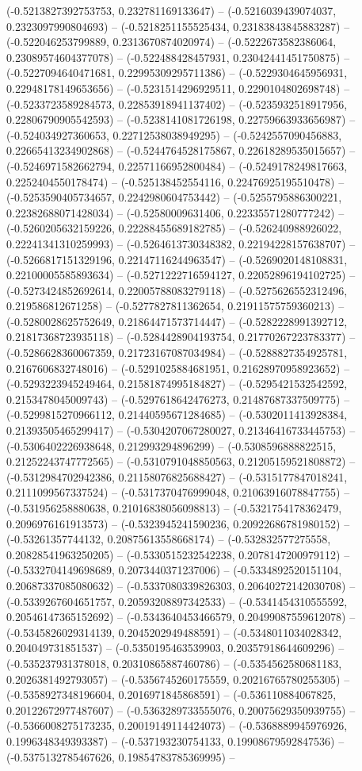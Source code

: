 (-0.5213827392753753, 0.232781169133647) -- (-0.5216039439074037, 0.2323097990804693) -- (-0.5218251155525434, 0.23183843845883287) -- (-0.522046253799889, 0.2313670874020974) -- (-0.5222673582386064, 0.23089574604377078) -- (-0.522488428457931, 0.23042441451750875) -- (-0.5227094640471681, 0.22995309295711386) -- (-0.5229304645956931, 0.22948178149653656) -- (-0.5231514296929511, 0.2290104802698748) -- (-0.5233723589284573, 0.22853918941137402) -- (-0.5235932518917956, 0.22806790905542593) -- (-0.5238141081726198, 0.22759663933656987) -- (-0.524034927360653, 0.22712538038949295) -- (-0.5242557090456883, 0.22665413234902868) -- (-0.5244764528175867, 0.22618289535015657) -- (-0.5246971582662794, 0.22571166952800484) -- (-0.5249178249817663, 0.2252404550178474) -- (-0.525138452554116, 0.22476925195510478) -- (-0.5253590405734657, 0.2242980604753442) -- (-0.5255795886300221, 0.22382688071428034) -- (-0.52580009631406, 0.22335571280777242) -- (-0.5260205632159226, 0.22288455689182785) -- (-0.526240988926022, 0.22241341310259993) -- (-0.5264613730348382, 0.22194228157638707) -- (-0.5266817151329196, 0.22147116244963547) -- (-0.5269020148108831, 0.22100005585893634) -- (-0.5271222716594127, 0.22052896194102725) -- (-0.5273424852692614, 0.22005788083279118) -- (-0.5275626552312496, 0.219586812671258) -- (-0.5277827811362654, 0.21911575759360213) -- (-0.5280028625752649, 0.21864471573714447) -- (-0.5282228991392712, 0.21817368723935118) -- (-0.5284428904193754, 0.21770267223783377) -- (-0.5286628360067359, 0.21723167087034984) -- (-0.5288827354925781, 0.2167606832748016) -- (-0.5291025884681951, 0.21628970958923652) -- (-0.5293223945249464, 0.21581874995184827) -- (-0.5295421532542592, 0.2153478045009743) -- (-0.5297618642476273, 0.21487687337509775) -- (-0.5299815270966112, 0.21440595671284685) -- (-0.5302011413928384, 0.21393505465299417) -- (-0.5304207067280027, 0.21346416733445753) -- (-0.5306402226938648, 0.212993294896299) -- (-0.5308596888822515, 0.21252243747772565) -- (-0.5310791048850563, 0.21205159521808872) -- (-0.5312984702942386, 0.21158076825688427) -- (-0.5315177847018241, 0.2111099567337524) -- (-0.5317370476999048, 0.21063916078847755) -- (-0.531956258880638, 0.21016838056098813) -- (-0.5321754178362479, 0.2096976161913573) -- (-0.5323945241590236, 0.20922686781980152) -- (-0.53261357744132, 0.20875613558668174) -- (-0.532832577275558, 0.20828541963250205) -- (-0.5330515232542238, 0.2078147200979112) -- (-0.5332704149698689, 0.2073440371237006) -- (-0.5334892520151104, 0.20687337085080632) -- (-0.5337080339826303, 0.20640272142030708) -- (-0.5339267604651757, 0.20593208897342533) -- (-0.5341454310555592, 0.20546147365152692) -- (-0.5343640453466579, 0.20499087559612078) -- (-0.5345826029314139, 0.2045202949488591) -- (-0.5348011034028342, 0.204049731851537) -- (-0.5350195463539903, 0.20357918644609296) -- (-0.535237931378018, 0.20310865887460786) -- (-0.5354562580681183, 0.2026381492793057) -- (-0.5356745260175559, 0.20216765780255305) -- (-0.5358927348196604, 0.2016971845868591) -- (-0.536110884067825, 0.20122672977487607) -- (-0.5363289733555076, 0.20075629350939755) -- (-0.5366008275173235, 0.20019149114424073) -- (-0.5368889945976926, 0.1996348349393387) -- (-0.537193230754133, 0.19908679592847536) -- (-0.5375132785467626, 0.19854783785369995) -- 